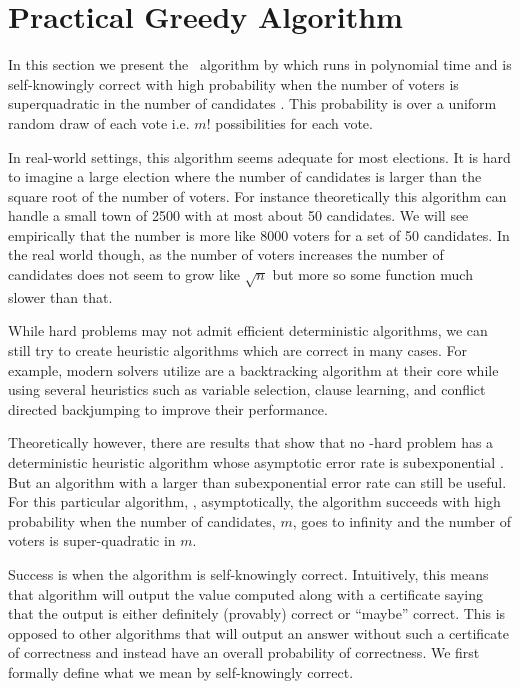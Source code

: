 \section{Practical Greedy Algorithm}\label{subsec:greedy}
In this section we present the \gwin ~algorithm by \citet{heuristic}
which runs in polynomial time and is self-knowingly
correct with high probability when the number of
voters is superquadratic in the number of candidates
\citep{heuristic}.
This probability is over a uniform random draw of each
vote i.e. $m!$ possibilities for each vote.

In real-world settings, this algorithm seems adequate for most elections.
It is hard to imagine a large election where the number of candidates is
larger than the square root of the number of voters.
For instance theoretically
this algorithm can handle a small town of 2500 with at most about
50 candidates.
We will see empirically that the number is more like 8000 voters for a set
of 50 candidates.
In the real world though, as the number of voters increases
the number of candidates does not seem to grow like $\sqrt{n}$ but more so
some function much slower than that.

While hard problems may not admit efficient deterministic
algorithms, we can still try to create heuristic
algorithms which are correct in many cases.
For example, modern  solvers utilize are a backtracking
algorithm
at their core while using
several heuristics such as variable selection, clause learning,
and conflict directed backjumping to improve their performance.

Theoretically however, there are results that show that
no \np-hard problem has a deterministic heuristic algorithm
whose asymptotic error rate is subexponential \citep{heuristic2012}.
But an algorithm with a larger than subexponential error rate can
still be useful.
For this particular algorithm, \gscore, asymptotically, the algorithm succeeds with
high probability when the number of candidates, $m$, goes to infinity
and the number of voters is super-quadratic in $m$.

Success is when the algorithm is self-knowingly correct.
Intuitively, this means that algorithm will output the value computed along with
a certificate saying that the output is either definitely (provably) correct or ``maybe''
correct.
This is opposed to other algorithms that will output an answer without such
a certificate of correctness and instead have an overall probability of correctness.
We first formally define what we mean by self-knowingly correct.


